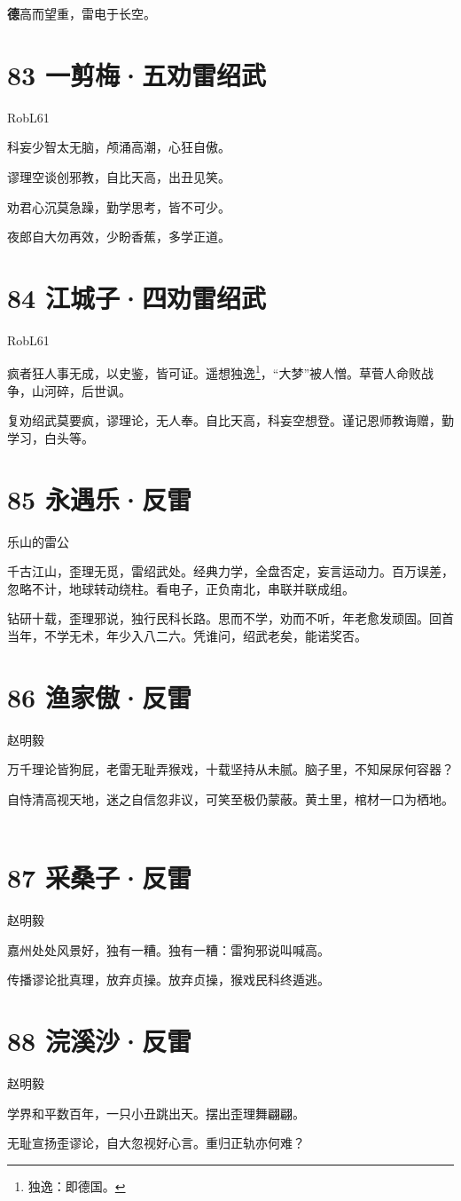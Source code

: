 \documentclass[UTF8,12pt,oneside]{ctexbook}
\def\pau#1{\begin{center} {#1} \end{center}} %
\def\poem#1#2{\section{#1}\pau{#2}} %
\def\lidend{\setlength\parindent{2em}}
\begin{document}
         \textbf{德}高而望重，雷电于长空。

     \lidend

\poem{83 一剪梅·五劝雷绍武}{RobL61}
\begin{center}
    科妄少智太无脑，颅涌高潮，心狂自傲。 

    谬理空谈创邪教，自比天高，出丑见笑。 

    劝君心沉莫急躁，勤学思考，皆不可少。 
    
    夜郎自大勿再效，少盼香蕉，多学正道。


    \end{center}

\newpage
\poem{84 江城子·四劝雷绍武}{RobL61}
    
    疯者狂人事无成，以史鉴，皆可证。遥想独逸\footnote{独逸：即德国。}，“大梦”被人憎。草菅人命败战争，山河碎，后世讽。 
    
    复劝绍武莫要疯，谬理论，无人奉。自比天高，科妄空想登。谨记恩师教诲赠，勤学习，白头等。
    ~\\

\poem{85 永遇乐·反雷}{乐山的雷公}

    千古江山，歪理无觅，雷绍武处。经典力学，全盘否定，妄言运动力。百万误差，忽略不计，地球转动绕柱。看电子，正负南北，串联并联成组。
    
    钻研十载，歪理邪说，独行民科长路。思而不学，劝而不听，年老愈发顽固。回首当年，不学无术，年少入八二六。凭谁问，绍武老矣，能诺奖否。

\newpage

\poem{86 渔家傲·反雷}{赵明毅}

    万千理论皆狗屁，老雷无耻弄猴戏，十载坚持从未腻。脑子里，不知屎尿何容器？
    
    自恃清高视天地，迷之自信忽非议，可笑至极仍蒙蔽。黄土里，棺材一口为栖地。
    ~\\

\poem{87 采桑子·反雷}{赵明毅}

    嘉州处处风景好，独有一糟。独有一糟：雷狗邪说叫喊高。 
    
    传播谬论批真理，放弃贞操。放弃贞操，猴戏民科终遁逃。
    ~\\

\poem{88 浣溪沙·反雷}{赵明毅}

    学界和平数百年，一只小丑跳出天。摆出歪理舞翩翩。 
    
    无耻宣扬歪谬论，自大忽视好心言。重归正轨亦何难？
    ~\\

\newpage
\end{document}
